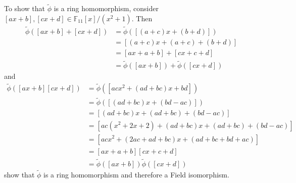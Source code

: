 \documentclass[12pt]{exam}
\theoremstyle{plain} %
\theoremstyle{definition} %
\theoremstyle{remark} %
\begin{document}
\begin{questions}
\begin{solution}
    To show that $\tilde{\phi}$ is a ring homomorphism, consider $[ax
    + b], [cx + d] \in \mathbb{F}_{11}[x]/(x^2 + 1)$. Then
    \begin{align*}
      \tilde{\phi}([ax + b] + [cx + d]) &=  \tilde{\phi}([(a+c) x + (b + d)]) \\
      &= [(a + c) x + (a +c) + (b + d)] \\
      &= [ax + a + b] + [cx + c + d] \\
      &=  \tilde{\phi}([ax + b]) +  \tilde{\phi}([cx + d])
    \end{align*}
    and
    \begin{align*}
      \tilde{\phi}([ax +b][cx + d]) &=  \tilde{\phi}([acx^2 + (ad +
      bc)x + bd]) \\
      &= \tilde{\phi}([(ad + bc)x + (bd - ac)]) \\
      &= [(ad + bc)x + (ad + bc) + (bd - ac)] \\
      &= [ac(x^2 + 2x + 2) + (ad + bc)x + (ad + bc) + (bd - ac)] \\
      &= [acx^2 + (2ac + ad + bc)x + (ad + bc + bd + ac)] \\
      &= [ax + a + b][cx + c + d]\\
      &= \tilde{\phi}([ax + b])\tilde{\phi}([cx + d])
    \end{align*}
    show that $\tilde{\phi}$ is a ring homomorphism and therefore a
    Field isomorphism.
  \end{solution}

  \question
  \begin{solution}
    \begin{parts}

\end{parts}
\end{solution}
\end{questions}
\end{document}
